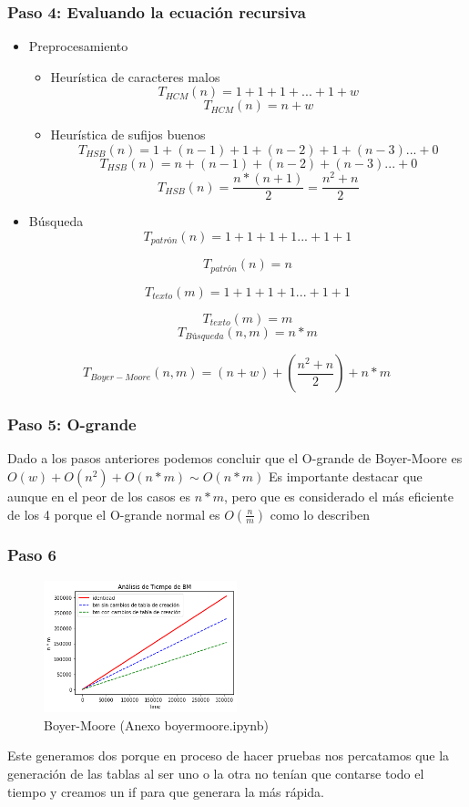 \subsubsection*{Paso 4: Evaluando la ecuación recursiva}
\begin{itemize}
    \item Preprocesamiento
    \begin{itemize}
        \item Heurística de caracteres malos
        \[T_{HCM}(n) = 1 + 1+ 1+ ... + 1 + w\]
        \[T_{HCM}(n) = n + w\]
        \item Heurística de sufijos buenos
        \[T_{HSB}(n) = 1 +  (n-1) + 1 + (n-2) + 1 + (n-3) ... + 0\]
        \[T_{HSB}(n) = n + (n-1) + (n-2) + (n-3) ... + 0\]
        \[T_{HSB}(n) = \frac{n*(n+1)}{2} = \frac{n^2 + n}{2}\]
    \end{itemize}
    \item Búsqueda
    \[T_{patrón}(n) = 1 + 1 + 1 + 1 ... + 1 + 1\]

    \[T_{patrón}(n) = n \]

    \[T_{texto}(m) = 1 + 1 + 1 + 1 ... + 1 + 1\]

    \[T_{texto}(m) = m \]
    \[T_{Búsqueda}(n,m) = n * m\]
\end{itemize}

\[T_{Boyer-Moore}(n,m) = (n+w) + (\frac{n^2 + n}{2}) + n*m\]

\subsubsection*{Paso 5: O-grande}
Dado a los pasos anteriores podemos concluir que el O-grande de Boyer-Moore es $O(w) + O(n^2) + O(n*m) \sim O(n*m)$
Es importante destacar que aunque en el peor de los casos es $n*m$, pero que es considerado el más eficiente de los 4 porque el O-grande normal es $O(\frac{n}{m})$ como lo describen \cite{TwoWaySM}

\subsubsection*{Paso 6}
\begin{figure} [H]
    \includegraphics[width=0.5\textwidth]{../codigoPythonJupyter/bm/Final.png}
    \caption{Boyer-Moore (Anexo boyermoore.ipynb)}
    \label{fig:bm}
\end{figure}
Este generamos dos porque en proceso de hacer pruebas nos percatamos que la generación de las tablas al ser uno o la otra no tenían que contarse todo el tiempo y creamos un if para que generara la más rápida.

